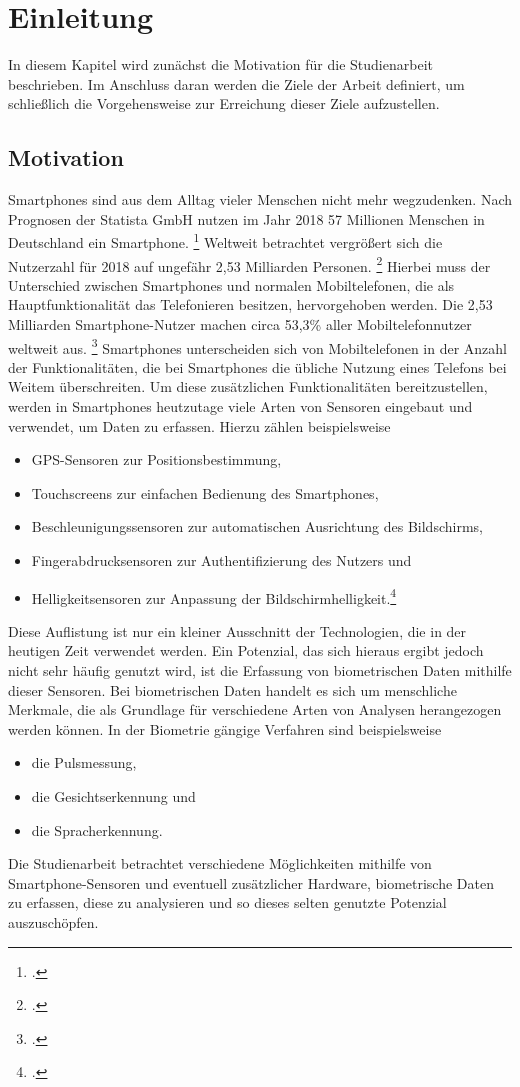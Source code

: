 \section{Einleitung}
In diesem Kapitel wird zunächst die Motivation für die Studienarbeit beschrieben. Im Anschluss daran werden die Ziele der Arbeit definiert, um  schließlich die Vorgehensweise zur Erreichung dieser Ziele aufzustellen.
\subsection{Motivation}
Smartphones sind aus dem Alltag vieler Menschen nicht mehr wegzudenken. Nach Prognosen der Statista GmbH nutzen im Jahr 2018 57 Millionen Menschen in Deutschland ein Smartphone. \footcite{Sta18a} Weltweit betrachtet vergrößert sich die Nutzerzahl für 2018 auf ungefähr 2,53 Milliarden Personen. \footcite{Sta18b}
Hierbei muss der Unterschied zwischen Smartphones und normalen Mobiltelefonen, die als Hauptfunktionalität das Telefonieren besitzen, hervorgehoben werden. Die 2,53 Milliarden Smartphone-Nutzer machen circa 53,3\% aller Mobiltelefonnutzer weltweit aus. \footcite{Sta18c} Smartphones unterscheiden sich von Mobiltelefonen in der Anzahl der Funktionalitäten, die bei Smartphones die übliche Nutzung eines Telefons bei Weitem überschreiten. Um diese zusätzlichen Funktionalitäten bereitzustellen, werden in Smartphones heutzutage viele Arten von Sensoren eingebaut und verwendet, um Daten zu erfassen. Hierzu zählen beispielsweise
\begin{itemize}[noitemsep, topsep=0pt]
	\item GPS-Sensoren zur Positionsbestimmung,
	\item Touchscreens zur einfachen Bedienung des Smartphones,
	\item Beschleunigungssensoren zur automatischen Ausrichtung des Bildschirms, 
	\item Fingerabdrucksensoren zur Authentifizierung des Nutzers und
	\item Helligkeitsensoren zur Anpassung der Bildschirmhelligkeit.\footcite[Vgl. ][]{Bie14}
\end{itemize}
Diese Auflistung ist nur ein kleiner Ausschnitt der Technologien, die in der heutigen Zeit verwendet werden. Ein Potenzial, das sich hieraus ergibt jedoch nicht sehr häufig genutzt wird, ist die Erfassung von biometrischen Daten mithilfe dieser Sensoren. Bei biometrischen Daten handelt es sich um menschliche Merkmale, die als Grundlage für verschiedene Arten von Analysen herangezogen werden können. In der Biometrie gängige Verfahren sind beispielsweise
\begin{itemize}[noitemsep, topsep=0pt]
	\item die Pulsmessung,
	\item die Gesichtserkennung und
	\item die Spracherkennung.
\end{itemize} Die Studienarbeit betrachtet verschiedene Möglichkeiten mithilfe von Smartphone-Sensoren und eventuell zusätzlicher Hardware, biometrische Daten zu erfassen, diese zu analysieren und so dieses selten genutzte Potenzial auszuschöpfen.
